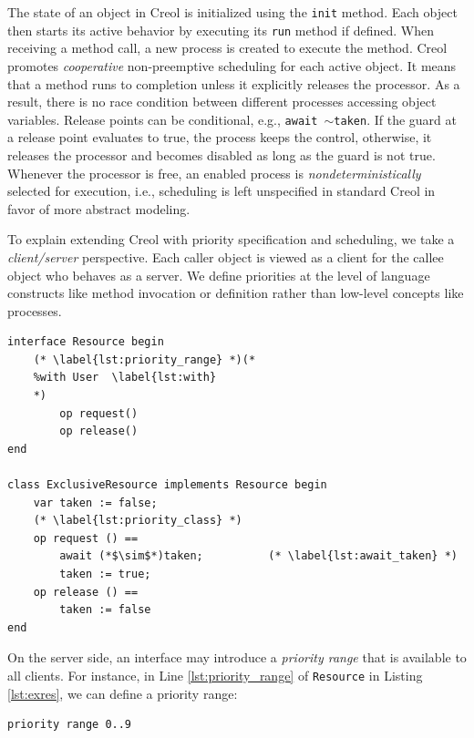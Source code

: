 The state of an object in Creol is initialized using the \lstinline{init} method.
Each object then starts its active behavior by executing its
\lstinline{run} method if defined. %
When receiving a method call, a new process is created to execute the method. 
Creol promotes {\em cooperative} non-preemptive scheduling for each active object. 
It means that a method runs to completion unless it explicitly releases the processor. 
As a result, there is no race condition between different processes accessing object variables. 
Release points can be conditional, e.g.,   \lstinline{await }$\sim$\lstinline{taken}. 
If the guard at a release point evaluates to true, the
process keeps the control, otherwise, it releases the processor and becomes
disabled as long as the guard is not true. Whenever the processor is free, an
enabled process is {\em nondeterministically} selected for execution, i.e.,
scheduling is left unspecified in standard Creol in favor of more abstract modeling.


To explain extending Creol with priority specification and scheduling, we take a {\em client/server} perspective.
Each {caller} object is viewed as a client for the {callee} object who behaves as a server. 
We define priorities at the level of language constructs like method invocation or definition rather than low-level concepts like processes.

\begin{lstlisting}[float=t, label=lst:exres, caption=Exclusive Resource in Creol %, multicols=2
]
interface Resource begin
	(* \label{lst:priority_range} *)(*
	%with User  \label{lst:with} 
	*)
		op request()
		op release()
end

class ExclusiveResource implements Resource begin
	var taken := false;
	(* \label{lst:priority_class} *)
	op request () == 
		await (*$\sim$*)taken; 			(* \label{lst:await_taken} *)
		taken := true;
	op release () ==
		taken := false
end
\end{lstlisting}


On the server side, an interface may introduce a \textit{priority
range} that is available to all clients. For instance, in Line
\ref{lst:priority_range} of {\footnotesize\texttt{Resource}} in Listing
\ref{lst:exres}, we can define a priority range: 

\begin{lstlisting}[frame=none, numbers=none]
priority range 0..9
\end{lstlisting}


